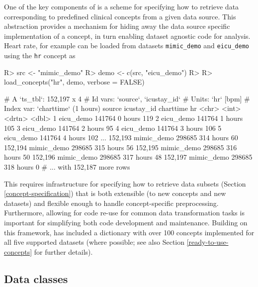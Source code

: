 \documentclass[
  notitle,
  nojss,
  noheadings]{jss}
\begin{document}
One of the key components of  is a scheme for specifying how
to retrieve data corresponding to predefined clinical concepts from a
given data source. This abstraction provides a mechanism for hiding away
the data source specific implementation of a concept, in turn enabling
dataset agnostic code for analysis. Heart rate, for example can be
loaded from datasets \texttt{mimic\_demo} and \texttt{eicu\_demo} using
the \texttt{hr} concept as

\begin{CodeChunk}
\begin{CodeInput}
R> src  <- "mimic_demo"
R> demo <- c(src, "eicu_demo")
R> 
R> load_concepts("hr", demo, verbose = FALSE)
\end{CodeInput}
\begin{CodeOutput}
# A `ts_tbl`: 152,197 x 4
# Id vars:    `source`, `icustay_id`
# Units:      `hr` [bpm]
# Index var:  `charttime` (1 hours)
        source     icustay_id charttime    hr
        <chr>           <int> <drtn>    <dbl>
      1 eicu_demo      141764   0 hours   119
      2 eicu_demo      141764   1 hours   105
      3 eicu_demo      141764   2 hours    95
      4 eicu_demo      141764   3 hours   106
      5 eicu_demo      141764   4 hours   102
    ...
152,193 mimic_demo     298685 314 hours    60
152,194 mimic_demo     298685 315 hours    56
152,195 mimic_demo     298685 316 hours    50
152,196 mimic_demo     298685 317 hours    48
152,197 mimic_demo     298685 318 hours     0
# ... with 152,187 more rows
\end{CodeOutput}
\end{CodeChunk}

This requires infrastructure for specifying how to retrieve data subsets
(Section \ref{concept-specification}) that is both extensible (to new
concepts and new datasets) and flexible enough to handle
concept-specific preprocessing. Furthermore, allowing for code re-use
for common data transformation tasks is important for simplifying both
code development and maintenance. Building on this framework, 
has included a dictionary with over 100 concepts implemented for all
five supported datasets (where possible; see also Section
\ref{ready-to-use-concepts} for further details).

\hypertarget{data-classes}{%
\subsection{Data classes}\label{data-classes}}
\end{document}
